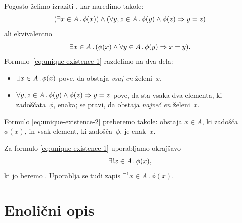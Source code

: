 Pogosto želimo izraziti , kar naredimo takole:
%
\begin{equation}
  \label{eq:unique-existence-1}
  (\exists x \in A \,.\, \phi(x)) \land (\forall y, z \in A \,.\, \phi(y) \land \phi(z) \Rightarrow y = z)
\end{equation}
%
ali ekvivalentno
%
\begin{equation}
  \label{eq:unique-existence-2}
  \exists x \in A \,.\, (\phi(x) \land \forall y \in A \,.\, \phi(y) \Rightarrow x = y).
\end{equation}
%
Formulo~\eqref{eq:unique-existence-1} razdelimo na dva dela:
%
\begin{itemize}
\item $\exists x \in A \,.\, \phi(x)$ pove, da obstaja \emph{vsaj en} želeni~$x$.
\item $\forall y, z \in A \,.\, \phi(y) \land \phi(z) \Rightarrow y = z$ pove, da sta vsaka dva elementa, ki zadoščata~$\phi$, enaka; se pravi, da obstaja \emph{največ en} želeni~$x$.
\end{itemize}
%
Formulo \eqref{eq:unique-existence-2} preberemo takole: obstaja $x \in A$, ki zadošča $\phi(x)$, in vsak element, ki zadošča~$\phi$, je enak~$x$.

Za formulo \eqref{eq:unique-existence-1} uporabljamo okrajšavo
%
\begin{equation*}
  \exists! x \in A \,.\, \phi(x),
\end{equation*}
%
ki jo beremo .
%
Uporablja se tudi zapis $\exists^1 x \in A \,.\, \phi(x)$.

\section{Enolični opis}

